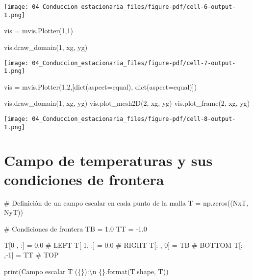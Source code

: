 \documentclass[
  letterpaper,
  DIV=11,
  numbers=noendperiod]{scrreprt}
\newenvironment{Shaded}{\begin{snugshade}}{\end{snugshade}}
\newcommand{\BuiltInTok}[1]{\textcolor[rgb]{0.00,0.23,0.31}{#1}}
\newcommand{\CharTok}[1]{\textcolor[rgb]{0.13,0.47,0.30}{#1}}
\newcommand{\CommentTok}[1]{\textcolor[rgb]{0.37,0.37,0.37}{#1}}
\newcommand{\DecValTok}[1]{\textcolor[rgb]{0.68,0.00,0.00}{#1}}
\newcommand{\FloatTok}[1]{\textcolor[rgb]{0.68,0.00,0.00}{#1}}
\newcommand{\NormalTok}[1]{\textcolor[rgb]{0.00,0.23,0.31}{#1}}
\newcommand{\OperatorTok}[1]{\textcolor[rgb]{0.37,0.37,0.37}{#1}}
\newcommand{\SpecialCharTok}[1]{\textcolor[rgb]{0.37,0.37,0.37}{#1}}
\newcommand{\StringTok}[1]{\textcolor[rgb]{0.13,0.47,0.30}{#1}}
\begin{document}
\texttt{[image: 04\_Conduccion\_estacionaria\_files/figure-pdf/cell-6-output-1.png]}

\begin{Shaded}
\begin{Highlighting}[]
\NormalTok{vis }\OperatorTok{=}\NormalTok{ mvis.Plotter(}\DecValTok{1}\NormalTok{,}\DecValTok{1}\NormalTok{)}

\NormalTok{vis.draw\_domain(}\DecValTok{1}\NormalTok{, xg, yg)}
\end{Highlighting}
\end{Shaded}

\texttt{[image: 04\_Conduccion\_estacionaria\_files/figure-pdf/cell-7-output-1.png]}

\begin{Shaded}
\begin{Highlighting}[]
\NormalTok{vis }\OperatorTok{=}\NormalTok{ mvis.Plotter(}\DecValTok{1}\NormalTok{,}\DecValTok{2}\NormalTok{,[}\BuiltInTok{dict}\NormalTok{(aspect}\OperatorTok{=}\StringTok{\textquotesingle{}equal\textquotesingle{}}\NormalTok{), }\BuiltInTok{dict}\NormalTok{(aspect}\OperatorTok{=}\StringTok{\textquotesingle{}equal\textquotesingle{}}\NormalTok{)])}

\NormalTok{vis.draw\_domain(}\DecValTok{1}\NormalTok{, xg, yg)}
\NormalTok{vis.plot\_mesh2D(}\DecValTok{2}\NormalTok{, xg, yg)}
\NormalTok{vis.plot\_frame(}\DecValTok{2}\NormalTok{, xg, yg)}
\end{Highlighting}
\end{Shaded}

\texttt{[image: 04\_Conduccion\_estacionaria\_files/figure-pdf/cell-8-output-1.png]}

\section{Campo de temperaturas y sus condiciones de
frontera}\label{campo-de-temperaturas-y-sus-condiciones-de-frontera}

\begin{Shaded}
\begin{Highlighting}[]
\CommentTok{\# Definición de un campo escalar en cada punto de la malla}
\NormalTok{T }\OperatorTok{=}\NormalTok{ np.zeros((NxT, NyT))}

\CommentTok{\# Condiciones de frontera}
\NormalTok{TB }\OperatorTok{=} \FloatTok{1.0}
\NormalTok{TT }\OperatorTok{=} \OperatorTok{{-}}\FloatTok{1.0}

\NormalTok{T[}\DecValTok{0}\NormalTok{ , :] }\OperatorTok{=} \FloatTok{0.0} \CommentTok{\# LEFT}
\NormalTok{T[}\OperatorTok{{-}}\DecValTok{1}\NormalTok{, :] }\OperatorTok{=} \FloatTok{0.0} \CommentTok{\# RIGHT}
\NormalTok{T[: , }\DecValTok{0}\NormalTok{] }\OperatorTok{=}\NormalTok{ TB  }\CommentTok{\# BOTTOM}
\NormalTok{T[: ,}\OperatorTok{{-}}\DecValTok{1}\NormalTok{] }\OperatorTok{=}\NormalTok{ TT  }\CommentTok{\# TOP}

\BuiltInTok{print}\NormalTok{(}\StringTok{\textquotesingle{}Campo escalar T (}\SpecialCharTok{\{\}}\StringTok{):}\CharTok{\textbackslash{}n}\StringTok{ }\SpecialCharTok{\{\}}\StringTok{\textquotesingle{}}\NormalTok{.}\BuiltInTok{format}\NormalTok{(T.shape, T))}
\end{Highlighting}
\end{Shaded}
\end{document}
